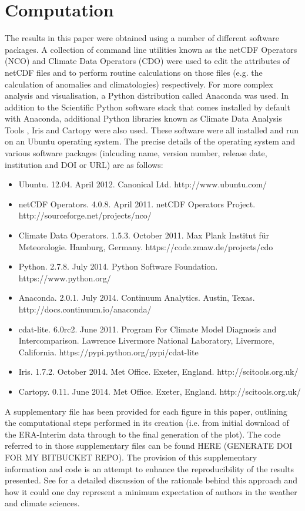\section{Computation}\label{s:computation}

The results in this paper were obtained using a number of different software packages. A collection of command line utilities known as the netCDF Operators (NCO) and Climate Data Operators (CDO) were used to edit the attributes of netCDF files and to perform routine calculations on those files (e.g. the calculation of anomalies and climatologies) respectively. For more complex analysis and visualisation, a Python distribution called Anaconda was used. In addition to the Scientific Python \citep[SciPy;][]{SciPy} software stack that comes installed by default with Anaconda, additional Python libraries known as Climate Data Analysis Tools \citep[CDAT;][]{Doutriaux2009}, Iris and Cartopy were also used. These software were all installed and run on an Ubuntu operating system. The precise details of the operating system and various software packages (inlcuding name, version number, release date, institution and DOI or URL) are as follows:
\begin{itemize}
\item Ubuntu. 12.04. April 2012. Canonical Ltd. http://www.ubuntu.com/
\item netCDF Operators. 4.0.8. April 2011. netCDF Operators Project. http://sourceforge.net/projects/nco/
\item Climate Data Operators. 1.5.3. October 2011. Max Plank Institut f{\"u}r Meteorologie. Hamburg, Germany. https://code.zmaw.de/projects/cdo
\item Python. 2.7.8. July 2014. Python Software Foundation. https://www.python.org/
\item Anaconda. 2.0.1. July 2014. Continuum Analytics. Austin, Texas. http://docs.continuum.io/anaconda/
\item cdat-lite. 6.0rc2. June 2011. Program For Climate Model Diagnosis and Intercomparison. Lawrence Livermore National Laboratory, Livermore, California. https://pypi.python.org/pypi/cdat-lite
\item Iris. 1.7.2. October 2014. Met Office. Exeter, England. http://scitools.org.uk/
\item Cartopy. 0.11. June 2014. Met Office. Exeter, England. http://scitools.org.uk/
\end{itemize}

A supplementary file has been provided for each figure in this paper, outlining the computational steps performed in its creation (i.e. from initial download of the ERA-Interim data through to the final generation of the plot). The code referred to in those supplementary files can be found HERE (GENERATE DOI FOR MY BITBUCKET REPO). The provision of this supplementary information and code is an attempt to enhance the reproducibility of the results presented. See \citet{Irving2015} for a detailed discussion of the rationale behind this approach and how it could one day represent a minimum expectation of authors in the weather and climate sciences. 